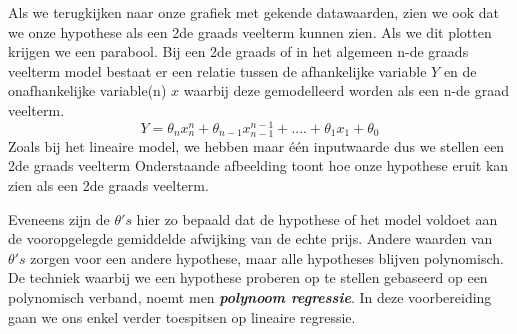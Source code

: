 %
Als we terugkijken naar onze grafiek met gekende datawaarden, zien we ook dat we onze hypothese als een 2de graads veelterm kunnen zien. Als we dit plotten krijgen we een parabool. Bij een 2de graads of in het algemeen n-de graads veelterm model bestaat er een relatie tussen de afhankelijke variable $Y$ en de onafhankelijke variable(n) $x$ waarbij deze gemodelleerd worden als een n-de graad veelterm.
%
\[Y = \theta_{n}x^{n}_{n} + \theta_{n-1}x^{n-1}_{n-1} + .... +  \theta_{1}x_{1} + \theta_{0} \]
%
Zoals bij het lineaire model, we hebben maar \'e\'en inputwaarde dus we stellen een 2de graads veelterm
%
Onderstaande afbeelding toont hoe onze hypothese eruit kan zien als een 2de graads veelterm.
\begin{center}
\end{center}
\newline
%
Eveneens zijn de $\theta's$ hier zo bepaald dat de hypothese of het model voldoet aan de vooropgelegde gemiddelde afwijking van de echte prijs. Andere waarden van $\theta's$ zorgen voor een andere  hypothese, maar alle hypotheses blijven polynomisch. De techniek waarbij we een hypothese proberen op te stellen gebaseerd op een polynomisch verband, noemt men \textbf{\textit{polynoom regressie}}. 
\newline
In deze voorbereiding gaan we ons enkel verder toespitsen op lineaire regressie. 

